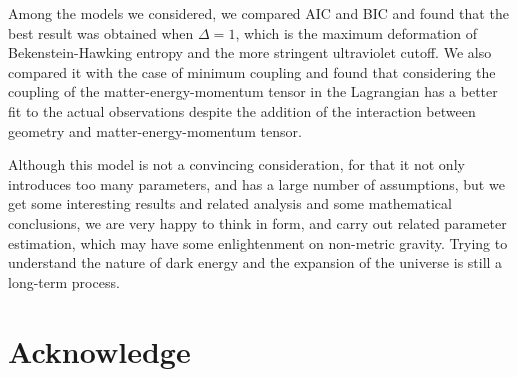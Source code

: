 \documentclass[a4paper,fleqn]{cas-sc}
\begin{document}
Among the models we considered, we compared AIC and BIC and found that the best result was obtained when $\Delta=1$, which is the maximum deformation of Bekenstein-Hawking entropy and the more stringent ultraviolet cutoff. We also compared it with the case of minimum coupling and found that considering the coupling of the matter-energy-momentum tensor in the Lagrangian has a better fit to the actual observations despite the addition of the interaction between geometry and matter-energy-momentum tensor.

Although this model is not a convincing consideration, for that it not only introduces too many parameters, and has a large number of assumptions, but we get some interesting results and related analysis and some mathematical conclusions, we are very happy to think in form, and carry out related parameter estimation, which may have some enlightenment on non-metric gravity. Trying to understand the nature of dark energy and the expansion of the universe is still a long-term process.

\section*{Acknowledge}








\end{document}
